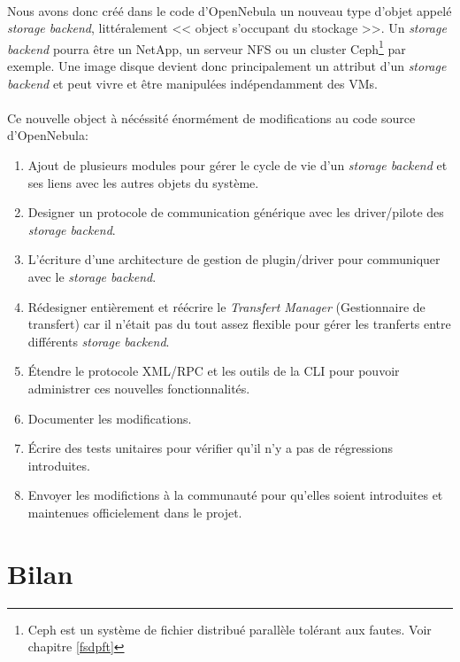 \paragraph*{}
Nous avons donc créé dans le code d'OpenNebula un nouveau type d'objet appelé \emph{storage backend}, littéralement << object s'occupant du stockage >>.
Un \emph{storage backend} pourra être un NetApp, un serveur NFS ou un cluster Ceph\footnote{Ceph est un système de fichier distribué parallèle tolérant aux fautes.
Voir chapitre \ref{fsdpft}} par exemple. Une image disque devient donc principalement un attribut d'un
\emph{storage backend} et peut vivre et être manipulées indépendamment des VMs.


\paragraph*{}
Ce nouvelle object à nécéssité énormément de modifications au code source d'OpenNebula:
\begin{enumerate}
	\item Ajout de plusieurs modules pour gérer le cycle de vie d'un \emph{storage backend} et ses liens avec les autres objets du système.
	\item Designer un protocole de communication générique avec les driver/pilote des \emph{storage backend}.
	\item L'écriture d'une architecture de gestion de plugin/driver pour communiquer avec le \emph{storage backend}.
	\item Rédesigner entièrement et réécrire le \emph{Transfert Manager} (Gestionnaire de transfert) car il n'était pas du tout assez flexible
		pour gérer les tranferts entre différents \emph{storage backend}.
	\item Étendre le protocole XML/RPC et les outils de la CLI pour pouvoir administrer ces nouvelles fonctionnalités.
	\item Documenter les modifications.
	\item Écrire des tests unitaires pour vérifier qu'il n'y a pas de régressions introduites.
	\item Envoyer les modifictions à la communauté pour qu'elles soient introduites et maintenues officielement dans le projet.
\end{enumerate}

\section{Bilan}

